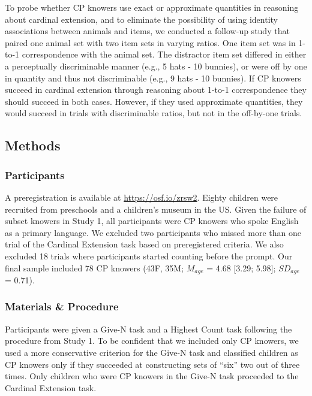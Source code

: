 \documentclass[10pt, letterpaper]{article}
\begin{document}
To probe whether CP knowers use exact or approximate quantities in
reasoning about cardinal extension, and to eliminate the possibility of
using identity associations between animals and items, we conducted a
follow-up study that paired one animal set with two item sets in varying
ratios. One item set was in 1-to-1 correspondence with the animal set.
The distractor item set differed in either a perceptually discriminable
manner (e.g., 5 hats - 10 bunnies), or were off by one in quantity and
thus not discriminable (e.g., 9 hats - 10 bunnies). If CP knowers
succeed in cardinal extension through reasoning about 1-to-1
correspondence they should succeed in both cases. However, if they used
approximate quantities, they would succeed in trials with discriminable
ratios, but not in the off-by-one trials.

\hypertarget{methods-1}{%
\subsection{Methods}\label{methods-1}}

\hypertarget{participants-1}{%
\subsubsection{Participants}\label{participants-1}}

A preregistration is available at \url{https://osf.io/zrsw2}. Eighty
children were recruited from preschools and a children's museum in the
US. Given the failure of subset knowers in Study 1, all participants
were CP knowers who spoke English as a primary language. We excluded two
participants who missed more than one trial of the Cardinal Extension
task based on preregistered criteria. We also excluded 18 trials where
participants started counting before the prompt. Our final sample
included 78 CP knowers (43F, 35M; \(M_{age}\) = 4.68 {[}3.29; 5.98{]};
\(SD_{age}\) = 0.71).

\hypertarget{materials-procedure-1}{%
\subsubsection{Materials \& Procedure}\label{materials-procedure-1}}

Participants were given a Give-N task and a Highest Count task following
the procedure from Study 1. To be confident that we included only CP
knowers, we used a more conservative criterion for the Give-N task and
classified children as CP knowers only if they succeeded at constructing
sets of ``six'' two out of three times. Only children who were CP
knowers in the Give-N task proceeded to the Cardinal Extension task.
\end{document}
